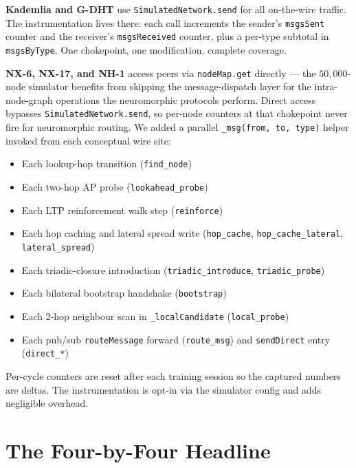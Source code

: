 \documentclass[twoside,nobib]{tufte-book}
\newcommand{\GDHT}{G-DHT\xspace}
\begin{document}
\textbf{Kademlia and \GDHT} use \texttt{SimulatedNetwork.send}
for all on-the-wire traffic. The instrumentation lives there:
each call increments the sender's \texttt{msgsSent} counter and
the receiver's \texttt{msgsReceived} counter, plus a per-type
subtotal in \texttt{msgsByType}. One chokepoint, one
modification, complete coverage.

\textbf{NX-6, NX-17, and NH-1} access peers via
\texttt{nodeMap.get} directly --- the $50{,}000$-node simulator
benefits from skipping the message-dispatch layer for the
intra-node-graph operations the neuromorphic protocols
perform. Direct access bypasses
\texttt{SimulatedNetwork.send}, so per-node counters at that
chokepoint never fire for neuromorphic routing. We added a
parallel \texttt{\_msg(from, to, type)} helper invoked from each
conceptual wire site:

\begin{itemize}\setlength\itemsep{0.1em}
  \item Each lookup-hop transition (\texttt{find\_node})
  \item Each two-hop AP probe (\texttt{lookahead\_probe})
  \item Each LTP reinforcement walk step (\texttt{reinforce})
  \item Each hop caching and lateral spread write
    (\texttt{hop\_cache}, \texttt{hop\_cache\_lateral},
    \texttt{lateral\_spread})
  \item Each triadic-closure introduction
    (\texttt{triadic\_introduce}, \texttt{triadic\_probe})
  \item Each bilateral bootstrap handshake (\texttt{bootstrap})
  \item Each 2-hop neighbour scan in
    \texttt{\_localCandidate} (\texttt{local\_probe})
  \item Each pub/sub \texttt{routeMessage} forward
    (\texttt{route\_msg}) and \texttt{sendDirect} entry
    (\texttt{direct\_*})
\end{itemize}

Per-cycle counters are reset after each training session so the
captured numbers are deltas. The instrumentation is opt-in via
the simulator config and adds negligible overhead.

\section{The Four-by-Four Headline}
\end{document}
